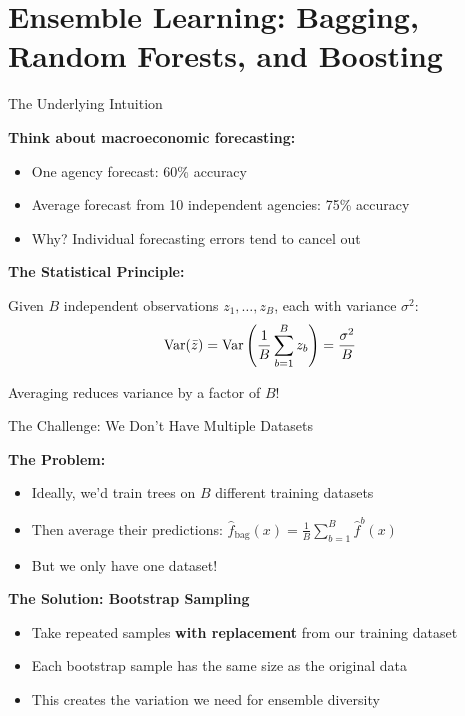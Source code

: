 \documentclass[10pt]{beamer}
\newcommand{\highlight}[1]{\textcolor{AccentOrange}{\textbf{#1}}}
\begin{document}
\section{Ensemble Learning: Bagging, Random Forests, and Boosting}

\begin{frame}{The Underlying Intuition}

\textbf{Think about macroeconomic forecasting:}
\begin{itemize}
\item One agency forecast: 60\% accuracy
\item Average forecast from 10 independent agencies: 75\% accuracy
\item Why? Individual forecasting errors tend to cancel out
\end{itemize}
\vspace{2em}

\textbf{The Statistical Principle:}

Given $B$ independent observations $z_1, \ldots, z_B$, each with variance $\sigma^2$:
\begin{align}
\text{Var}(\bar{z}) = \text{Var}\left(\frac{1}{B}\sum_{b=1}^B z_b\right) = \frac{\sigma^2}{B}\notag
\end{align}

Averaging reduces variance by a factor of $B$!


\end{frame}


\begin{frame}{The Challenge: We Don't Have Multiple Datasets}

\textbf{The Problem:}
\begin{itemize}
\item Ideally, we'd train trees on $B$ different training datasets
\item Then average their predictions: $\widehat{f}_{\text{bag}}(x) = \frac{1}{B}\sum_{b=1}^B \widehat{f}^b(x)$
\item But we only have one dataset!
\end{itemize}
\vspace{2em}

\textbf{The Solution: Bootstrap Sampling}
\begin{itemize}
\item Take repeated samples \highlight{with replacement} from our training dataset
\item Each bootstrap sample has the same size as the original data
\item This creates the variation we need for ensemble diversity
\end{itemize}

\end{frame}
\end{document}
